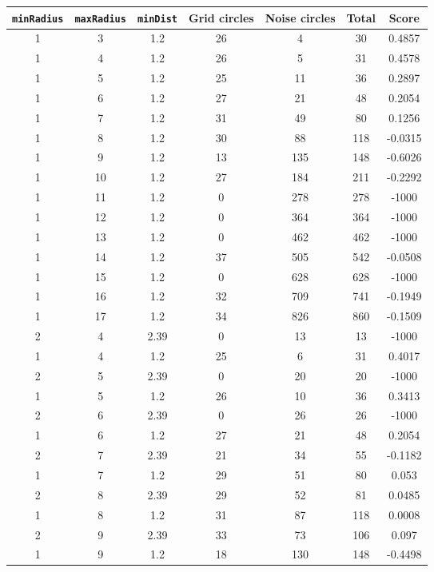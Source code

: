 \documentclass[letterpaper, 12pt]{article}
\begin{document}
\begin{longtable}{|c|c|c|c|c|c|c|}
\hline
\textbf{\texttt{minRadius}} & \textbf{\texttt{maxRadius}} & \textbf{\texttt{minDist}} & \textbf{Grid circles} & \textbf{Noise circles} & \textbf{Total} & \textbf{Score} \\
\hline
1 & 3 & 1.2 & 26 & 4 & 30 & 0.4857 \\
\hline
1 & 4 & 1.2 & 26 & 5 & 31 & 0.4578 \\
\hline
1 & 5 & 1.2 & 25 & 11 & 36 & 0.2897 \\
\hline
1 & 6 & 1.2 & 27 & 21 & 48 & 0.2054 \\
\hline
1 & 7 & 1.2 & 31 & 49 & 80 & 0.1256 \\
\hline
1 & 8 & 1.2 & 30 & 88 & 118 & -0.0315 \\
\hline
1 & 9 & 1.2 & 13 & 135 & 148 & -0.6026 \\
\hline
1 & 10 & 1.2 & 27 & 184 & 211 & -0.2292 \\
\hline
1 & 11 & 1.2 & 0 & 278 & 278 & -1000 \\
\hline
1 & 12 & 1.2 & 0 & 364 & 364 & -1000 \\
\hline
1 & 13 & 1.2 & 0 & 462 & 462 & -1000 \\
\hline
1 & 14 & 1.2 & 37 & 505 & 542 & -0.0508 \\
\hline
1 & 15 & 1.2 & 0 & 628 & 628 & -1000 \\
\hline
1 & 16 & 1.2 & 32 & 709 & 741 & -0.1949 \\
\hline
1 & 17 & 1.2 & 34 & 826 & 860 & -0.1509 \\
\hline
2 & 4 & 2.39 & 0 & 13 & 13 & -1000 \\
\hline
1 & 4 & 1.2 & 25 & 6 & 31 & 0.4017 \\
\hline
2 & 5 & 2.39 & 0 & 20 & 20 & -1000 \\
\hline
1 & 5 & 1.2 & 26 & 10 & 36 & 0.3413 \\
\hline
2 & 6 & 2.39 & 0 & 26 & 26 & -1000 \\
\hline
1 & 6 & 1.2 & 27 & 21 & 48 & 0.2054 \\
\hline
2 & 7 & 2.39 & 21 & 34 & 55 & -0.1182 \\
\hline
1 & 7 & 1.2 & 29 & 51 & 80 & 0.053 \\
\hline
2 & 8 & 2.39 & 29 & 52 & 81 & 0.0485 \\
\hline
1 & 8 & 1.2 & 31 & 87 & 118 & 0.0008 \\
\hline
2 & 9 & 2.39 & 33 & 73 & 106 & 0.097 \\
\hline
1 & 9 & 1.2 & 18 & 130 & 148 & -0.4498 \\

\end{longtable}
\end{document}
